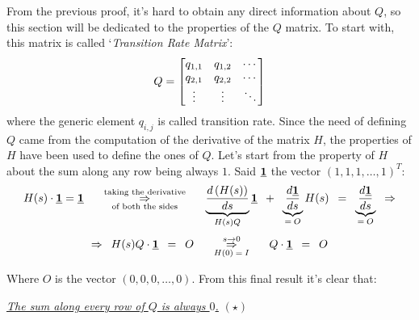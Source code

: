 \documentclass[12pt,a4paper]{article}
\begin{document}
From the previous proof, it's hard to obtain any direct information about $Q$, so this section will be dedicated to the properties of the $Q$ matrix. To start with, this matrix is called `\emph{Transition Rate Matrix}':
$$
Q=\left[
\begin{matrix}
q_{1,1} & q_{1,2} &  \cdots \cr
q_{2,1} & q_{2,2} &  \cdots \cr
\vdots & \vdots &  \ddots
\end{matrix}
\right]
$$
where the generic element $q_{i,j}$ is called transition rate. Since the need of defining $Q$ came from the computation of the derivative of the matrix $H$, the properties of $H$ have been used to define the ones of $Q$. Let's start from the property of $H$ about the sum along any row being always $1$. Said $\textrm{\underline{\textbf{1}}}$ 
the vector $\left(1,1,1,\dots,1\right)^T$:
$$
H(s)\cdot \textrm{\underline{\textbf{1}}} = \textrm{\underline{\textbf{1}}}
\hspace{15pt}
\overset{\textrm{taking the derivative}}{\underset{\textrm{of both the sides}}{\Rightarrow}}
\hspace{15pt}
\underbrace{\frac{d\left(H(s)\right)}{ds}}_{H(s)Q}\textrm{\underline{\textbf{1}}}
\hspace{5pt}+\hspace{5pt}
\underbrace{\frac{d\textrm{\underline{\textbf{1}}}}{ds}}_{
=\hspace{2pt}O}H(s)
\hspace{5pt}=\hspace{5pt}
\underbrace{\frac{d\textrm{\underline{\textbf{1}}}}{ds}}_{=\hspace{2pt}O}
\hspace{5pt}\Rightarrow
$$
$$
\Rightarrow\hspace{5pt}
H(s)Q\cdot \textrm{\underline{\textbf{1}}}\hspace{5pt}=\hspace{5pt}O
\hspace{15pt}
\overset{s\rightarrow 0}{\underset{H(0)\hspace{2pt}=\hspace{2pt}I}{\Rightarrow}}
\hspace{15pt}
Q\cdot \textrm{\underline{\textbf{1}}}\hspace{5pt}=\hspace{5pt}O
$$

\bigskip
\noindent
Where $O$ is the vector $\left(0,0,0,\dots,0\right)$. From this final result it's clear that:

\bigskip\noindent
\underline{\emph{The sum along every row of $Q$ is always $0$.}} \hspace{232pt} $(\star )$
\end{document}
